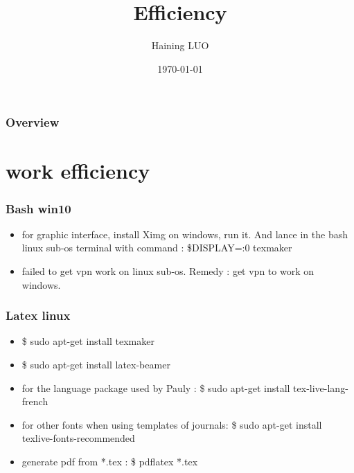 \documentclass{beamer}
\title[Notes]{Efficiency} %
\author{Haining LUO} %
\institute[] %
{
ECL \\ %
\medskip
\textit{haining.luo@doctorant.ec-lyon.fr} %
}
\date{\today} %
\begin{document}
\begin{frame}
\titlepage %
\end{frame}

\begin{frame}
\frametitle{Overview} %
\tableofcontents %
\end{frame}

\section{work efficiency}


\begin{frame}
\frametitle{Bash win10}
\begin{itemize}

	\item for graphic interface, install Ximg on windows, run it. And lance in the bash linux sub-os terminal with command : \$DISPLAY=:0 texmaker
	
	\item failed to get vpn work on linux sub-os. Remedy : get vpn to work on windows.

\end{itemize}
\end{frame}


\begin{frame}
\frametitle{Latex linux}
\begin{itemize}

	\item \$ sudo apt-get install texmaker
	
	\item \$ sudo apt-get install latex-beamer
	
	\item for the language package used by Pauly : \$ sudo apt-get install tex-live-lang-french  
	
	\item for other fonts when using templates of journals: \$ sudo apt-get install texlive-fonts-recommended

	\item generate pdf from *.tex : \$ pdflatex *.tex

\end{itemize}
\end{frame}
\end{document}

